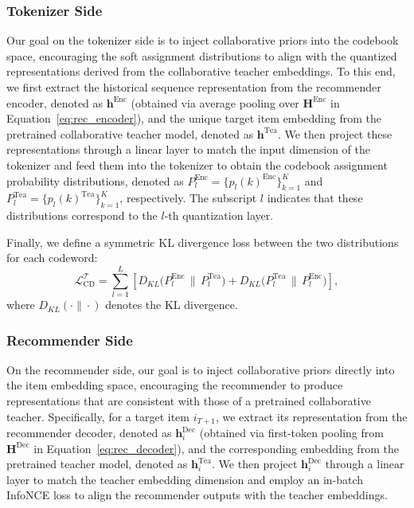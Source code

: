 \subsubsection{Tokenizer Side}

Our goal on the tokenizer side is to inject collaborative priors into the codebook space, encouraging the soft assignment distributions to align with the quantized representations derived from the collaborative teacher embeddings. To this end, we first extract the historical sequence representation from the recommender encoder, denoted as $\bm{h}^\text{Enc}$ (obtained via average pooling over $\bm{H}^\text{Enc}$ in Equation~\eqref{eq:rec_encoder}), and the unique target item embedding from the pretrained collaborative teacher model, denoted as $\bm{h}^\text{Tea}$. We then project these representations through a linear layer to match the input dimension of the tokenizer and feed them into the tokenizer to obtain the codebook assignment probability distributions, denoted as $P_l^\text{Enc}=\{p_l(k)^\text{Enc}\}_{k=1}^K$ and $P_l^\text{Tea}=\{p_l(k)^\text{Tea}\}_{k=1}^K$, respectively. The subscript $l$ indicates that these distributions correspond to the $l$-th quantization layer.


Finally, we define a symmetric KL divergence loss between the two distributions for each codeword:
\begin{equation}\label{eq:CDT}
    \mathcal{L}_\text{CD}^\mathcal{T} = \sum_{l=1}^{L} \left[ D_{KL}\big(P_l^\text{Enc} \,\|\, P_l^\text{Tea}\big) + D_{KL}\big(P_l^\text{Tea} \,\|\, P_l^\text{Enc}\big) \right],
\end{equation}
where $D_{KL}(\cdot \| \cdot)$ denotes the KL divergence. 



\subsubsection{Recommender Side}

On the recommender side, our goal is to inject collaborative priors directly into the item embedding space, encouraging the recommender to produce representations that are consistent with those of a pretrained collaborative teacher. Specifically, for a target item $i_{T+1}$, we extract its representation from the recommender decoder, denoted as $\bm{h}^\text{Dec}_i$ (obtained via first-token pooling from $\bm{H}^\text{Dec}$ in Equation~\eqref{eq:rec_decoder}), and the corresponding embedding from the pretrained teacher model, denoted as $\bm{h}^\text{Tea}_i$. We then project $\bm{h}^\text{Dec}_i$ through a linear layer to match the teacher embedding dimension and employ an in-batch InfoNCE loss to align the recommender outputs with the teacher embeddings.

